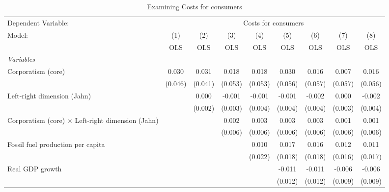 
\begin{table}[htbp]
   \caption{Examining Costs for consumers}
   \centering
   \begin{tabular}{lcccccccc}
      \toprule
      Dependent Variable: & \multicolumn{8}{c}{Costs for consumers}\\
      Model:                                                   & (1)     & (2)     & (3)     & (4)     & (5)     & (6)     & (7)     & (8)\\  
                                                               &  OLS    & OLS     & OLS     & OLS     & OLS     & OLS     & OLS     & OLS\\  
      \midrule
      \emph{Variables}\\
      Corporatism (core)                                       & 0.030   & 0.031   & 0.018   & 0.018   & 0.030   & 0.016   & 0.007   & 0.016\\   
                                                               & (0.046) & (0.041) & (0.053) & (0.053) & (0.056) & (0.057) & (0.057) & (0.056)\\   
      Left-right dimension (Jahn)                              &         & 0.000   & -0.001  & -0.001  & -0.001  & -0.002  & 0.000   & -0.002\\   
                                                               &         & (0.002) & (0.003) & (0.004) & (0.004) & (0.004) & (0.003) & (0.004)\\   
      Corporatism (core) $\times$ Left-right dimension (Jahn)  &         &         & 0.002   & 0.003   & 0.003   & 0.003   & 0.001   & 0.001\\   
                                                               &         &         & (0.006) & (0.006) & (0.006) & (0.006) & (0.006) & (0.006)\\   
      Fossil fuel production per capita                        &         &         &         & 0.010   & 0.017   & 0.016   & 0.012   & 0.011\\   
                                                               &         &         &         & (0.022) & (0.018) & (0.018) & (0.016) & (0.017)\\   
      Real GDP growth                                          &         &         &         &         & -0.011  & -0.011  & -0.006  & -0.006\\   
                                                               &         &         &         &         & (0.012) & (0.012) & (0.009) & (0.009)\\   

\end{tabular}
\end{table}
